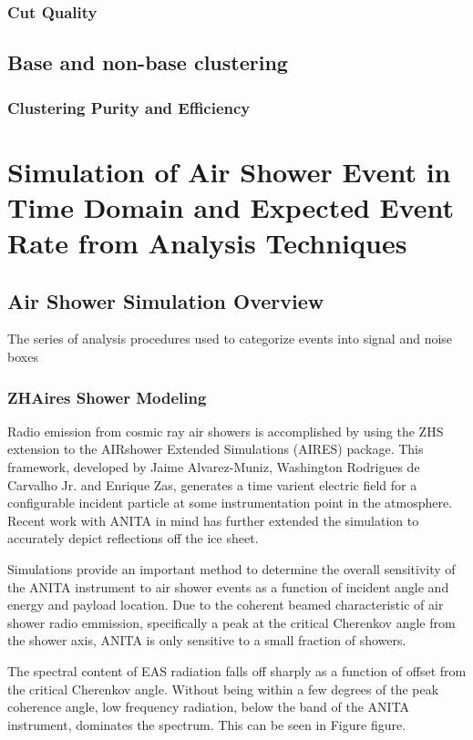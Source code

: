 	\subsection{Cut Quality}


\section{Base and non-base clustering}
	\subsection{Clustering Purity and Efficiency}


	
	

\chapter{Simulation of Air Shower Event in Time Domain and Expected Event Rate from Analysis Techniques}
\section{Air Shower Simulation Overview}
	The series of analysis procedures used to categorize events into signal and noise boxes
	\subsection{ZHAires Shower Modeling}
		Radio emission from cosmic ray air showers is accomplished by using the ZHS extension to the AIRshower Extended Simulations (AIRES) package.\cite{AlvarezMuñiz2012325}  This framework, developed by Jaime Alvarez-Muniz, Washington Rodrigues de Carvalho Jr. and Enrique Zas, generates a time varient electric field for a configurable incident particle at some instrumentation point in the atmosphere.  Recent work with ANITA in mind has further extended the simulation to accurately depict reflections off the ice sheet.
		
		Simulations provide an important method to determine the overall sensitivity of the ANITA instrument to air shower events as a function of incident angle and energy and payload location.  Due to the coherent beamed characteristic of air shower radio emmission, specifically a peak at the critical Cherenkov angle from the shower axis, ANITA is only sensitive to a small fraction of showers.
		
		The spectral content of EAS radiation falls off sharply as a function of offset from the critical Cherenkov angle.  Without being within a few degrees of the peak coherence angle, low frequency radiation, below the band of the ANITA instrument, dominates the spectrum.  This can be seen in Figure figure.  
		
